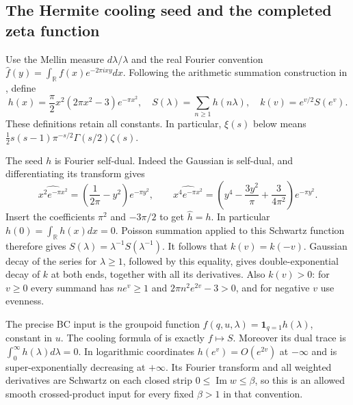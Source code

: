 \subsection{The Hermite cooling seed and the completed zeta function}
\label{sec:rh-hermite-cooling}

Use the Mellin measure $d\lambda/\lambda$ and the real Fourier convention
$\widehat f(y)=\int_{\mathbb R}f(x)e^{-2\pi ixy}dx$. Following the
arithmetic summation construction in \cite[\S6.2]{connes2026}, define
\begin{equation}
 h(x)=\frac{\pi}{2}x^2(2\pi x^2-3)e^{-\pi x^2},\quad
 S(\lambda)=\sum_{n\ge1}h(n\lambda),\quad
 k(v)=e^{v/2}S(e^v).
 \label{eq:rh-hermite-seed}
\end{equation}
These definitions retain all constants. In particular, $\xi(s)$ below
means $\frac12s(s-1)\pi^{-s/2}\Gamma(s/2)\zeta(s)$.

The seed $h$ is Fourier self-dual. Indeed the Gaussian is self-dual,
and differentiating its transform gives
\[
 \widehat{x^2e^{-\pi x^2}}
   =\left(\frac1{2\pi}-y^2\right)e^{-\pi y^2},\qquad
 \widehat{x^4e^{-\pi x^2}}
   =\left(y^4-\frac{3y^2}{\pi}+\frac3{4\pi^2}\right)e^{-\pi y^2}.
\]
Insert the coefficients $\pi^2$ and $-3\pi/2$ to get $\widehat h=h$.
In particular $h(0)=\int_{\mathbb R}h(x)dx=0$.
Poisson summation applied to this Schwartz function therefore gives
$S(\lambda)=\lambda^{-1}S(\lambda^{-1})$.
It follows that $k(v)=k(-v)$. Gaussian decay of the series for
$\lambda\ge1$, followed by this equality, gives double-exponential
decay of $k$ at both ends, together with all its derivatives.
Also $k(v)>0$: for $v\ge0$ every summand has $n e^v\ge1$ and
$2\pi n^2e^{2v}-3>0$, and for negative $v$ use evenness.

The precise BC input is the groupoid function
$f(q,u,\lambda)=\boldsymbol1_{q=1}h(\lambda)$, constant in $u$.
The cooling formula of \cite[\S4.4]{ccmEndomotives}
is exactly $f\mapsto S$. Moreover its dual trace is
$\int_0^\infty h(\lambda)d\lambda=0$.
In logarithmic coordinates $h(e^v)=O(e^{2v})$ at $-\infty$ and is
super-exponentially decreasing at $+\infty$. Its Fourier transform
and all weighted derivatives are Schwartz on each closed strip
$0\le\operatorname{Im}w\le\beta$, so this is an allowed smooth
crossed-product input for every fixed $\beta>1$ in that convention.

